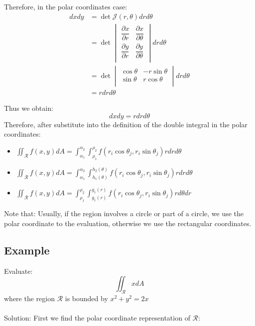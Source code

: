 \documentclass[UTF8,a4paper, 10pt, openany]{svmono}
\begin{document}
Therefore, in the polar coordinates case:
\begin{align*}
dxdy& =\det\mathcal{J}(r,\theta)drd\theta\\
&=\det
\begin{vmatrix}
\dfrac{\partial x}{\partial r} & \dfrac{\partial x}{\partial \theta} \\
\dfrac{\partial y}{\partial r} & \dfrac{\partial y}{\partial \theta} \\
\end{vmatrix}drd\theta\\
&=\det
\begin{vmatrix}
\cos \theta & -r\sin \theta \\
\sin \theta & r\cos \theta \\
\end{vmatrix}drd\theta\\
&=rdrd\theta
\end{align*}

Thus we obtain:
$$dxdy=rdrd\theta$$
Therefore, after substitute into the definition of the double integral in the polar coordinates:

\begin{itemize}
\item $\displaystyle\iint_{\mathcal{R}}f(x,y)dA=\int_{\alpha_{1}}^{\alpha_{2}}\int_{\rho_{1}}^{\rho_{2}}f(r_{i}\cos \theta_{j},r_{i}\sin \theta_{j})rdrd\theta$
\item $\displaystyle\iint_{\mathcal{R}}f(x,y)dA=\int_{\alpha_{1}}^{\alpha_{2}}\int_{h_{1}(\theta)}^{h_{2}(\theta)}f(r_{i}\cos \theta_{j},r_{i}\sin \theta_{j})rdrd\theta$
\item $\displaystyle\iint_{\mathcal{R}}f(x,y)dA=\int_{\rho_{1}}^{\rho_{2}}\int_{g_{1}(r)}^{g_{1}(r)}f(r_{i}\cos \theta_{j},r_{i}\sin \theta_{j})rd\theta dr$
\end{itemize}

Note that: Usually, if the region involves a circle or part of a circle, we use the polar coordinate to the evaluation, otherwise we use the rectangular coordinates.

\subsection{Example}
Evaluate:
$$\iint_{\mathcal{R}}xdA$$
where the region $\mathcal{R}$ is bounded by $x^2+y^2=2x$\\ \\

Solution: First we find the polar coordinate representation of $\mathcal{R}$:\\
\end{document}
